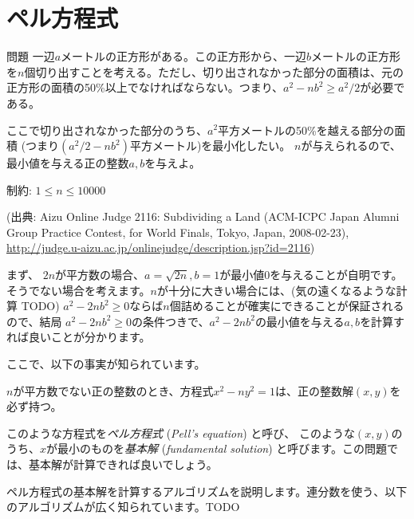 \documentclass{jsarticle}
\begin{document}
 \section{ペル方程式}
 \label{sec:pells-equation}
 \begin{itembox}{問題}
  一辺$a$メートルの正方形がある。この正方形から、一辺$b$メートルの正方形を$n$個切り出すことを考える。ただし、切り出されなかった部分の面積は、元の正方形の面積の50\%以上でなければならない。つまり、$a^2-nb^2 \ge a^2/2$が必要である。

  ここで切り出されなかった部分のうち、$a^2$平方メートルの50\%を越える部分の面積
  (つまり$(a^2/2-nb^2)$平方メートル)を最小化したい。
  $n$が与えられるので、最小値を与える正の整数$a,b$を与えよ。

  制約: $1 \le n \le 10000$

  (出典: Aizu Online Judge 2116: Subdividing a Land (ACM-ICPC Japan Alumni Group Practice Contest, for World Finals, Tokyo, Japan, 2008-02-23),
  \url{http://judge.u-aizu.ac.jp/onlinejudge/description.jsp?id=2116})
 \end{itembox}
 まず、 $2n$が平方数の場合、$a = \sqrt{2n},b=1$が最小値0を与えることが自明です。
 そうでない場合を考えます。$n$が十分に大きい場合には、(気の遠くなるような計算 TODO) $a^2 - 2nb^2 \ge 0$ならば$n$個詰めることが確実にできることが保証されるので、結局 $a^2 - 2nb^2 \ge 0$の条件つきで、$a^2 - 2nb^2$の最小値を与える$a,b$を計算すれば良いことが分かります。

 ここで、以下の事実が知られています。
 \begin{theorem}
  \label{thm:pells-equation-has-solutions}
  $n$が平方数でない正の整数のとき、方程式$x^2 - ny^2=1$は、正の整数解$(x,y)$を必ず持つ。
 \end{theorem}
 このような方程式を\emph{ペル方程式} (\emph{Pell's equation}) と呼び、
 このような$(x,y)$のうち、$x$が最小のものを\emph{基本解} (\emph{fundamental solution}) と呼びます。この問題では、基本解が計算できれば良いでしょう。

 ペル方程式の基本解を計算するアルゴリズムを説明します。連分数を使う、以下のアルゴリズムが広く知られています。TODO
\end{document}

